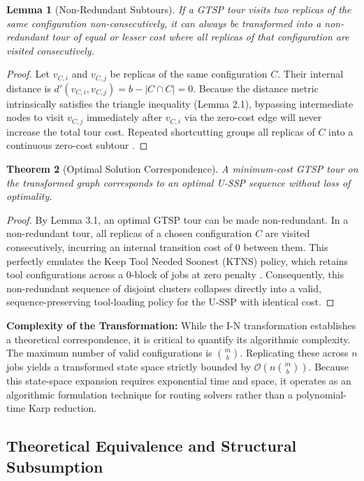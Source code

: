 \documentclass[12pt]{article}
\newtheorem{theorem}{Theorem}[section]
\newtheorem{lemma}[theorem]{Lemma}
\begin{document}
\begin{lemma}[Non-Redundant Subtours]
	If a GTSP tour visits two replicas of the same configuration non-consecutively, it can always be transformed into a non-redundant tour of equal or lesser cost where all replicas of that configuration are visited consecutively.
\end{lemma}
\begin{proof}
	Let $v_{C, i}$ and $v_{C, j}$ be replicas of the same configuration $C$. Their internal distance is $d'(v_{C,i}, v_{C,j}) = b - |C \cap C| = 0$. Because the distance metric intrinsically satisfies the triangle inequality (Lemma 2.1), bypassing intermediate nodes to visit $v_{C, j}$ immediately after $v_{C, i}$ via the zero-cost edge will never increase the total tour cost. Repeated shortcutting groups all replicas of $C$ into a continuous zero-cost subtour \citep{Lien1993}.
\end{proof}

\begin{theorem}[Optimal Solution Correspondence]
	A minimum-cost GTSP tour on the transformed graph corresponds to an optimal U-SSP sequence without loss of optimality.
\end{theorem}
\begin{proof}
	By Lemma 3.1, an optimal GTSP tour can be made non-redundant. In a non-redundant tour, all replicas of a chosen configuration $C$ are visited consecutively, incurring an internal transition cost of 0 between them. This perfectly emulates the Keep Tool Needed Soonest (KTNS) policy, which retains tool configurations across a 0-block of jobs at zero penalty \citep{Tang1988}. Consequently, this non-redundant sequence of disjoint clusters collapses directly into a valid, sequence-preserving tool-loading policy for the U-SSP with identical cost.
\end{proof}

\textbf{Complexity of the Transformation:} While the I-N transformation establishes a theoretical correspondence, it is critical to quantify its algorithmic complexity. The maximum number of valid configurations is $\binom{m}{b}$. Replicating these across $n$ jobs yields a transformed state space strictly bounded by $\mathcal{O}(n \binom{m}{b})$. Because this state-space expansion requires exponential time and space, it operates as an algorithmic formulation technique for routing solvers rather than a polynomial-time Karp reduction.

\subsection{Theoretical Equivalence and Structural Subsumption}
\end{document}
